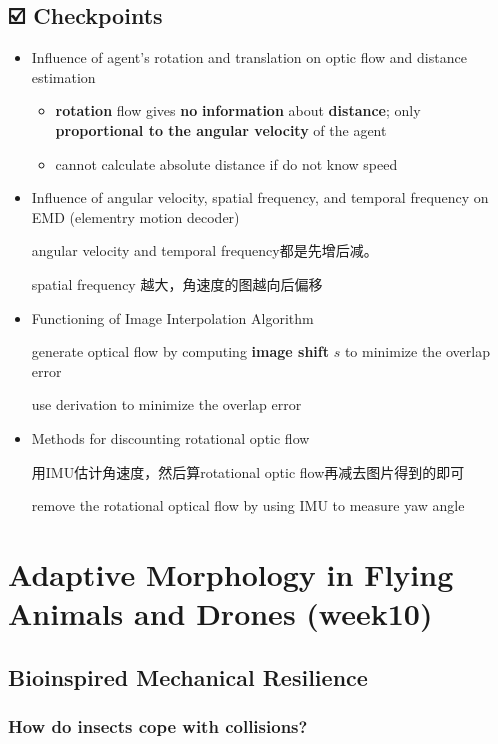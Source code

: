 \documentclass[]{article}
\begin{document}
\subsection{☑️ Checkpoints}\label{header-n2474}

\begin{itemize}
\item
  Influence of agent's rotation and translation on optic flow and
  distance estimation

  \begin{itemize}
  \item
    \textbf{rotation} flow gives \textbf{no} \textbf{information} about
    \textbf{distance}; only \textbf{proportional to the angular
    velocity} of the agent
  \item
    cannot calculate absolute distance if do not know speed
  \end{itemize}
\item
  Influence of angular velocity, spatial frequency, and temporal
  frequency on EMD (elementry motion decoder)

  angular velocity and temporal frequency都是先增后减。

  spatial frequency 越大，角速度的图越向后偏移
\item
  Functioning of Image Interpolation Algorithm

  generate optical flow by computing \textbf{image shift} \(s\) to
  minimize the overlap error

  use derivation to minimize the overlap error
\item
  Methods for discounting rotational optic flow

  用IMU估计角速度，然后算rotational optic flow再减去图片得到的即可

  remove the rotational optical flow by using IMU to measure yaw angle
\end{itemize}

\section{Adaptive Morphology in Flying Animals and Drones
(week10)}\label{header-n2495}

\subsection{Bioinspired Mechanical Resilience}\label{header-n2496}

\subsubsection{How do insects cope with collisions?}\label{header-n2497}
\end{document}
